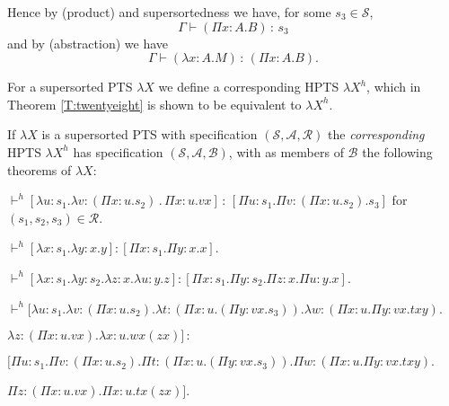 \documentclass{LMCS}
\def\:{\mathbin{\,:\,}}
\def\.{\mathbin{\,.\,}}
\begin{document}
  Hence by (product) and supersortedness we have, for some $s_3\in
  {\mathcal S}$,
\[\Gamma\vdash (\Pi x{:}A.B)\:s_3\]
  and by (abstraction) we have
\[\Gamma\vdash(\lambda x{:}A.M)\:(\Pi x{:}A.B).\]

  For a supersorted PTS $\lambda X$ we define a corresponding HPTS
  $\lambda X^h$, which in Theorem \ref{T:twentyeight} is shown to be
  equivalent to $\lambda X^h$.

\begin{defi}\label{D:ssHPTS}

  If $\lambda X$ is a supersorted PTS with specification $({\mathcal
    S}, {\mathcal A}, {\mathcal R})$ the \emph{corresponding} HPTS
  $\lambda X^h$ has specification $({\mathcal S}, {\mathcal
    A},{\mathcal B})$, with as members of ${\mathcal B}$ the following
  theorems of $\lambda X$:

$\vdash^h[\lambda u{:}s_1 .\lambda v{:}(\Pi x{:}u
  . s_2)\.\Pi x{:}u.vx]\:[\Pi u{:}s_1.\Pi v{:}(\Pi
  x{:}u. s_2).s_3]$ for $(s_1,s_2,s_3)\in\mathcal R$.\hfill

$\vdash^h[\lambda x{:}s_1.\lambda y{:}x.y]:[\Pi x{:}s_1.\Pi y{:}x.x]$.\hfill

$\vdash^h[\lambda x{:}s_1 .\lambda
  y{:}s_2.\lambda z{:}x . \lambda u{:}y . z]:[\Pi x{:}s_1 .\Pi
  y{:}s_2 .\Pi z{:}x.\Pi u{:}y.x]$.\hfill

$\vdash^h[\lambda u{:}s_1.\lambda
  v{:}(\Pi x{:}u.s_2).\lambda t{:}(\Pi x{:}u.(\Pi y{:}vx.s_3)).\lambda
  w{:}(\Pi x{:}u.\Pi y{:}vx.txy)$.\hfill

\noindent\phantom{\bf Axiom \hbox to21 pt{$\bf S1$\hfil}$\vdash^h[$}$\lambda z{:}(\Pi x{:}u.vx).\lambda x{:}u. wx(zx)]\:$\hfill 

\noindent{}$[\Pi u{:}s_1.\Pi v{:}(\Pi x{:}u.s_2).\Pi t:(\Pi x{:}u .(\Pi y{:}vx.s_3)).\Pi w{:}(\Pi x{:}u.\Pi y{:}vx.txy).$\hfill

\noindent\phantom{\bf Axiom \hbox to21 pt{$\bf S1$\hfil}$\vdash^h[$}$\Pi z{:}(\Pi x{:}u.vx).\Pi x{:}u.tx(zx)]$.\hfill


\end{defi}
\end{document}
